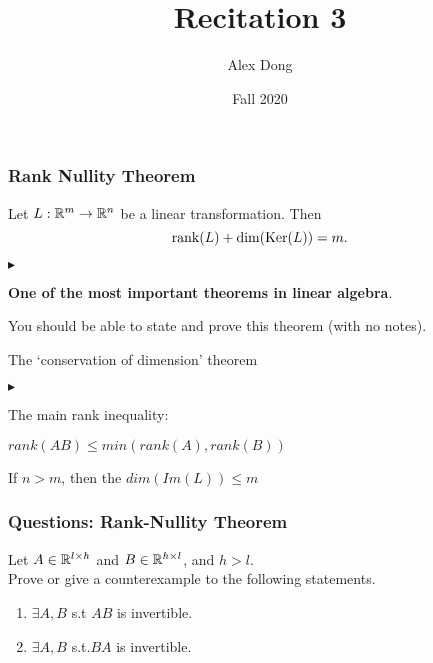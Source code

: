 \documentclass{beamer}
\title{Recitation 3}
\author{Alex Dong}
\institute{CDS, NYU}
\date{Fall 2020}
\renewenvironment{itemize}
\renewenvironment{enumerate}%
{\begin{list}{\arabic{enumi}.}%
      {\setlength{\leftmargin}{2.5em}%
       \setlength{\itemsep}{-\parsep}%
       \setlength{\topsep}{-\parskip}%
       \usecounter{enumi}}%
 }{\end{list}}
\renewenvironment{itemize}%
{\begin{list}{$\blacktriangleright$}%
      {\setlength{\leftmargin}{2.5em}%
       \setlength{\itemsep}{-\parsep}%
       \setlength{\topsep}{-\parskip}%
       \usecounter{enumi}}%
 }{\end{list}}
\begin{document}
\frame{\titlepage} 
\begin{frame}
\frametitle{Rank Nullity Theorem}
\begin{theorem}
	Let $L: \mathbb{R}^m \to \mathbb{R}^n$ be a linear transformation. Then
	$$
	{{\rm rank}}(L) + {{\rm dim}}({{\rm Ker}}(L)) = m.
	$$
\end{theorem}
\begin{itemize}
\item \textbf{One of the most important theorems in linear algebra}.\\
\item You should be able to state and prove this theorem (with no notes).
\item The `conservation of dimension' theorem
\begin{itemize}
\item The main rank inequality:
\item $rank(AB)\leq min(rank(A),rank(B))$
\end{itemize}
\item If $n>m$, then the $dim(Im(L)) \leq m$

\end{itemize}
\end{frame}

\begin{frame}
\frametitle{Questions: Rank-Nullity Theorem}
Let $A\in \mathbb{R}^{l\times h}$ and $B\in \mathbb{R}^{h\times l}$, and $h>l$.\\
Prove or give a counterexample to the following statements.
\begin{enumerate}
\item $\exists A,B$ s.t $AB$ is invertible.
\item $\exists A,B$ s.t.$BA$ is invertible.
\end{enumerate}

\end{frame}
\end{document}
